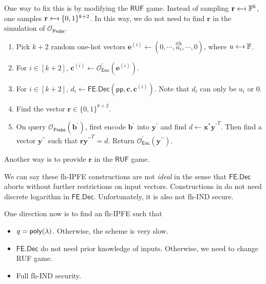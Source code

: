 One way to fix this is by modifying the $\textsf{RUF}$ game. Instead of sampling $\mathbf{r} \getsdollar \mathbb{F}^{k}$, one samples $\mathbf{r} \getsdollar \{0, 1\}^{k+2}$. In this way, we do not need to find $\mathbf{r}$ in the simulation of $\mathcal{O}_{\textsf{Probe}}$. 
\begin{enumerate}

\item Pick $k+2$ random one-hot vectors $\mathbf{e}^{(i)} \gets (0, \cdots, \overset{i\text{th}}{u_i}, \cdots, 0)$, where $u \getsdollar \mathbb{F}$.

\item For $i \in [k+2]$, $\mathbf{c}^{(i)} \gets \mathcal{O}^\prime_{\textsf{Enc}}(\mathbf{e}^{(i)})$.

\item For $i \in [k+2]$, $d_i \gets \textsf{FE.Dec}(\textsf{pp}, \mathbf{c}, \mathbf{c}^{(i)})$. Note that $d_i$ can only be $u_i$ or $0$.

\item Find the vector $\mathbf{r} \in \{0, 1\}^{k+2}$.

\item On query $\mathcal{O}_{\textsf{Probe}}(\mathbf{b}^\prime)$, first encode $\mathbf{b}^\prime$ into $\mathbf{y}^\prime$ and find $d \gets \mathbf{x}^{*}{\mathbf{y}^\prime}^T$. Then find a vector $\mathbf{y}^{\prime\prime}$ such that $\mathbf{r} {\mathbf{y}^{\prime\prime}}^T = d$. Return $\mathcal{O}^\prime_{\textsf{Enc}}(\mathbf{y}^{\prime\prime})$.

\end{enumerate}
Another way is to provide $\mathbf{r}$ in the $\textsf{RUF}$ game.

We can say these fh-IPFE constructions are not \emph{ideal} in the sense that $\textsf{FE.Dec}$ aborts without further restrictions on input vectors. Constructions in \cite{10.1007/978-3-030-90567-5_33} do not need discrete logarithm in $\textsf{FE.Dec}$. Unfortunately, it is also not \textsf{fh-IND} secure.

One direction now is to find an fh-IPFE such that

\begin{itemize}
	\item $q = \mathsf{poly}(\lambda)$. Otherwise, the scheme is very slow.

	\item $\textsf{FE.Dec}$ do not need prior knowledge of inputs. Otherwise, we need to change \textsf{RUF} game.
	
	\item Full \textsf{fh-IND} security.
\end{itemize}



